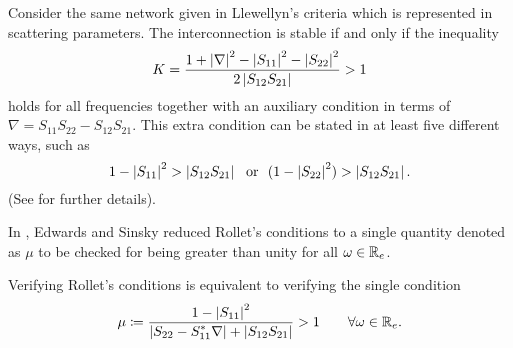 \begin{thm} Consider the same network given in Llewellyn's criteria which is represented in scattering parameters.
The interconnection is stable if and only if the inequality 
\begin{equation}
K = \frac{1+\displaystyle \left|\nabla\right|^2-\displaystyle \left|S_{11}\right|^2-\displaystyle \left|S_{22}\right|^2}{2\displaystyle \left|S_{12}S_{21}\right|} > 1
\end{equation}
holds for all frequencies together with an auxiliary condition in terms of $\nabla = S_{11}S_{22}-
S_{12}S_{21}$. This extra condition can be stated in at least five different ways, such as 
\[ 
1-\displaystyle \left|S_{11}\right|^2 > \displaystyle \left|S_{12}S_{21}\right|\ \text{ or } \ (1-\displaystyle \left|S_{22}\right|^2)> \displaystyle \left|S_{12}S_{21}\right|. 
\] 
(See \cite{edsin} for further details). 
\end{thm}

In \cite{edsin}, Edwards and Sinsky reduced Rollet's conditions to a single quantity denoted as $\mu$ to be checked 
for being greater than unity for all $\omega\in\mathbb{R}_e$. 
 \begin{thm} Verifying Rollet's conditions is equivalent to verifying the single condition
\[
\mu\coloneqq \frac{1-\displaystyle \left|S_{11}\right|^2}{\displaystyle \left|S_{22}-S_{11}^*\nabla\right|+\displaystyle \left|S_{12}S_{21}\right|} > 1\qquad \forall \omega\in\mathbb{R}_e.
\]
\end{thm}
